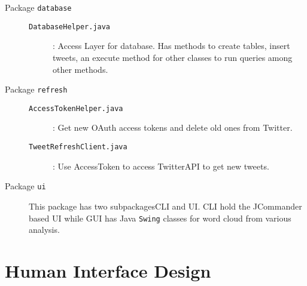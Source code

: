 \documentclass[a4paper, 12pt]{article}
\begin{document}
\begin{adjustwidth}{1em}{0pt}
\begin{description}
	\item[Package \texttt{database}]
		\begin{description}
		\item[\texttt{DatabaseHelper.java}] : Access Layer for database. Has methods to create tables, insert tweets, an execute 	method for other classes to run queries among other methods.
		\end{description}

	\item[Package \texttt{refresh}]
		\begin{description}
		\item[\texttt{AccessTokenHelper.java}] : Get new OAuth access tokens and delete old ones from Twitter.
		\item[\texttt{TweetRefreshClient.java}] : Use AccessToken to access TwitterAPI to get new tweets.
		\end{description}

	\item[Package \texttt{ui}] This package has two subpackages\textendash CLI and UI. CLI hold the JCommander based UI while GUI has Java \texttt{Swing} classes for word cloud from various analysis.

\end{description}
\end{adjustwidth}

\section{Human Interface Design} \label{sec:human}
\end{document}
